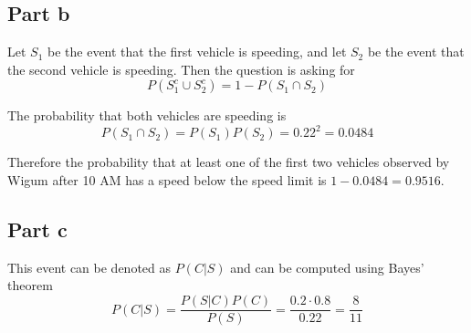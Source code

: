 \subsection{Part b}

Let $S_1$ be the event that the first vehicle is speeding, and let $S_2$ be the event that the second vehicle is speeding. Then the question is asking for
\[
	P(S_1^c \cup S_2^c) = 1-P(S_1\cap S_2)
\]

The probability that both vehicles are speeding is
\[
	P(S_1\cap S_2) = P(S_1)P(S_2) = 0.22^2 = 0.0484
\]

Therefore the probability that at least one of the first two vehicles observed by Wigum after 10 AM has a speed below the speed limit is $1-0.0484 = 0.9516$.

\subsection{Part c}

This event can be denoted as $P(C|S)$ and can be computed using Bayes' theorem
\[
	P(C|S) = \frac{P(S|C)P(C)}{P(S)} = \frac{0.2\cdot 0.8}{0.22} = \frac{8}{11}
\]
